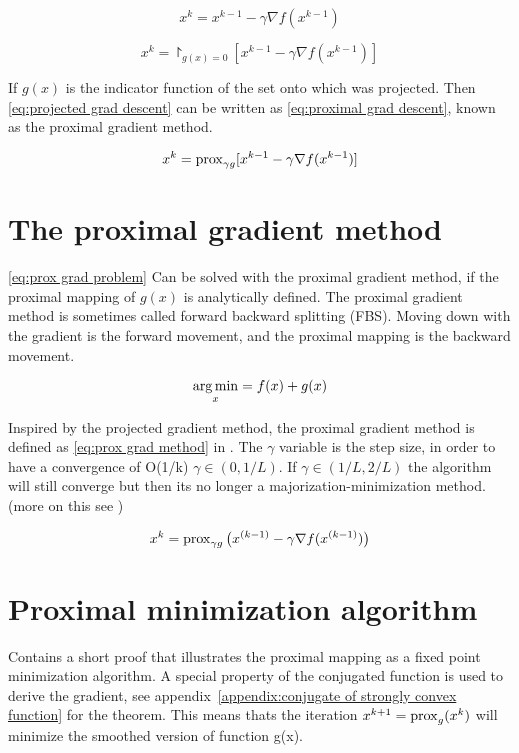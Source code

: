 		\begin{equation}
			x^k = x^{k-1} - \gamma \nabla f(x^{k-1})
			\label{eq:grad descent}
		\end{equation}
		
		\begin{equation}
			x^k = \project_{g(x)=0}[ x^{k-1} - \gamma \nabla f(x^{k-1})]
			\label{eq:projected grad descent}
		\end{equation}
		
		If $g(x)$ is the indicator function of the set onto which was projected. Then  \eqref{eq:projected grad descent} can be written as \eqref{eq:proximal grad descent}, known as the proximal gradient method.
		
		\begin{equation}
				x^k = \operatorname{prox}_{\gamma g}[ x^{k-1} - \gamma \nabla f(x^{k-1})]
			\label{eq:proximal grad descent}
		\end{equation}
	
	\section{The proximal gradient method}
		\eqref{eq:prox grad problem} Can be solved with the proximal gradient method, if the proximal mapping of $g(x)$ is analytically defined.  The proximal gradient method is sometimes called forward backward splitting (FBS). Moving down with the gradient is the forward movement, and the proximal mapping is the backward movement.
		
			\begin{equation}
			\underset{x}{\operatorname*{arg\,min}} = f(x) + g(x)
			\label{eq:prox grad problem}
			\end{equation}
		
		Inspired by the projected gradient method, the proximal gradient method is defined as \eqref{eq:prox grad method} in \cite{NealParikh}. The $\gamma$ variable is the step size, in order to have a convergence of O(1/k) $\gamma \in(0,1/L)$. If $\gamma \in (1/L,2/L)$ the algorithm will still converge but then its no longer a majorization-minimization method. (more on this see \cite{NealParikh})
		
		\begin{equation}
			x^k = \operatorname{prox}_{\gamma g}\big( x^{(k-1)}- \gamma \nabla f(x^{(k-1)})\big)
			\label{eq:prox grad method}
		\end{equation}	
	
	\section{Proximal minimization algorithm}
		 \cite{QianYang} Contains a short proof that illustrates the proximal mapping as a fixed point minimization algorithm. A special property of the conjugated function is used to derive the gradient, see appendix~\ref{appendix:conjugate of strongly convex function} for the theorem. This means thats the iteration $x^{k+1}=\operatorname{prox}_g(x^k)$ will minimize the smoothed version of function g(x). 
		 
